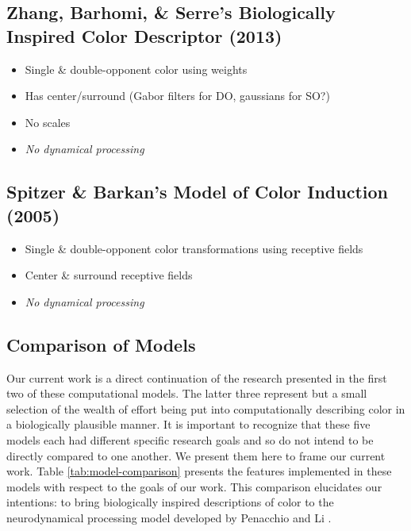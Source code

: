 \documentclass[journal,onecolumn]{IEEEtran}
\begin{document}
\subsection*{Zhang, Barhomi, \& Serre's Biologically Inspired Color Descriptor (2013)}
\begin{itemize}
    \item Single \& double-opponent color using weights
    \item Has center/surround (Gabor filters for DO, gaussians for SO?)
    \item No scales
    \item \textit{No dynamical processing}
\end{itemize}


\subsection*{Spitzer \& Barkan's Model of Color Induction (2005)}
\begin{itemize}
    \item Single \& double-opponent color transformations using receptive fields
    \item Center \& surround receptive fields
    \item \textit{No dynamical processing}
\end{itemize}

\subsection*{Comparison of Models}
Our current work is a direct continuation of the research presented in the first two of these computational models. The latter three represent but a small selection of the wealth of effort being put into computationally describing color in a biologically plausible manner. It is important to recognize that these five models each had different specific research goals and so do not intend to be directly compared to one another. We present them here to frame our current work. Table \ref{tab:model-comparison} presents the features implemented in these models with respect to the goals of our work. This comparison elucidates our intentions: to bring biologically inspired descriptions of color to the neurodynamical processing model developed by Penacchio \cite{penacchio:2013} and Li \cite{li:1999}.
\end{document}
